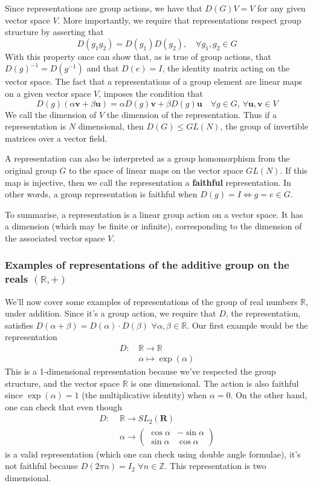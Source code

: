Since representations are group actions, we have that $D(G) V = V $ for any given vector space $V $. More importantly, we require that representations respect group structure by asserting that
\[
D(g_1 g_2) = D(g_1)D(g_2), \quad \forall g_1, g_2 \in G  
\]
With this property once can show that, as is true of group actions, that $D(g)^{-1} = D(g^{-1}) $ and that $D( e) = I$, the identity matrix acting on the vector space. 
The fact that a representations of a group element are linear maps on a given vector space $V$, imposes the condition that \[ D(g)(\alpha \mathbf{v} + \beta \mathbf{u} ) = \alpha D(g) \mathbf{v} + \beta D(g) \mathbf{u} \quad  \forall g \in G, \, \forall \mathbf{u}, \mathbf{v} \in V \] 
We call the dimension of $V$ the dimension of the representation. Thus if a representation is $N$ dimensional, then $D( G) \leq GL(N ) $, the group of invertible matrices over a vector field. 

A representation can also be interpreted as a group homomorphism from the original group $G$ to the space of linear maps on the vector space $GL (N) $. If this map is injective, then we call the representation a \textbf{ faithful } representation. In other words, a group representation is faithful when $D(g) = I \iff g = e \in G$. 

To summarise, a representation is a linear group action on a vector space. It has a dimension (which may be finite or infinite), corresponding to the dimension of the associated vector space $V$. 

\subsubsection{ Examples of representations of the additive group on the reals $\left( \mathbb{R}, + \right) $} 
We'll now cover some examples of representations of the group of real numbers $\mathbb{R}$, under addition. Since it's a group action, we require that $D$, the representation, satisfies $D( \alpha + \beta ) = D( \alpha) \cdot D( \beta ) \,\, \forall \alpha, \beta \in \mathbb{ R} $.  Our first example would be the representation 
\begin{align*} 
D:\, &  \mathbb{R} \rightarrow \mathbb{ R} \\ 
& \alpha \mapsto \exp ( \alpha )    
\end{align*} 
This is a 1-dimensional representation because we've respected the group structure, and the vector space $\mathbb{ R} $ is one dimensional. The action is also faithful since $\exp (\alpha ) = 1$ (the multiplicative identity) when $\alpha = 0$. On the other hand, one can check that even though
\begin{align*} 
D: \, \, &  \mathbb{ R} \rightarrow SL_2 ( \mathbf{R} ) \\
& \alpha \rightarrow \begin{pmatrix} \cos \alpha & - \sin \alpha \\ 
\sin \alpha & \cos \alpha \end{pmatrix}  
\end{align*} 
is a valid representation (which one can check using double angle formulae), it's not faithful because $D(2 \pi n )  = I_2 \, \,  \forall n \in \mathbb{Z} $. This representation is two dimensional.  


